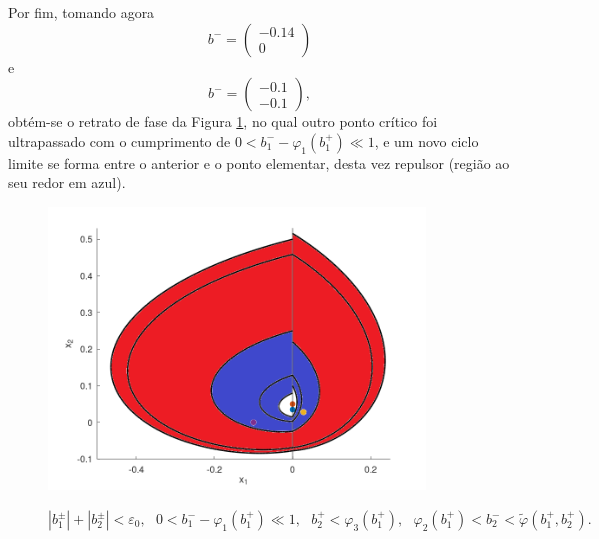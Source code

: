 Por fim, tomando agora 
\[
b^-=\begin{pmatrix}
-0.14\\
0
\end{pmatrix}
\]
e
\[
b^-=\begin{pmatrix}
-0.1\\
-0.1
\end{pmatrix},
\]
obtém-se o retrato de fase da Figura \ref{dist}, no qual outro ponto crítico foi ultrapassado com o cumprimento de $0<b_{1}^{-}-\varphi_{1}\left(b_{1}^{+}\right) \ll 1$, e um novo ciclo limite se forma entre o anterior e o ponto elementar, desta vez repulsor (região ao seu redor em azul).
\begin{figure}[H]
\centering
\includegraphics[width=10cm]{disturb_pos}\\
\caption{\label{dist}$\left|b_{1}^{\pm}\right|+\left|b_{2}^{\pm}\right|<\varepsilon_{0},\text{ }0<b_{1}^{-}-\varphi_{1}\left(b_{1}^{+}\right) \ll 1,\text{ }b_{2}^{+}<\varphi_{3}\left(b_{1}^{+}\right),\text{ }  \varphi_{2}\left(b_{1}^{+}\right)<b_{2}^{-}<\tilde{\varphi}\left(b_{1}^{+}, b_{2}^{+}\right).$}
\end{figure}
